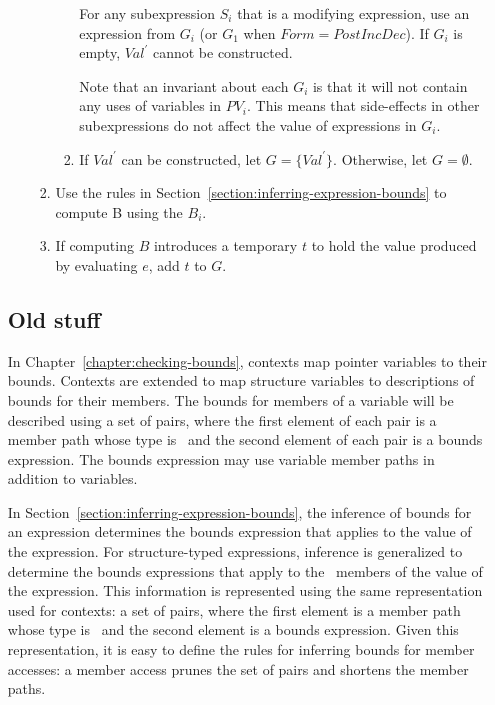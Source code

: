 \begin{enumerate}
\begin{enumerate}
\begin{enumerate}
\begin{enumerate}
      For any subexpression $S_i$ that is a modifying expression, 
      use an expression from $G_i$ (or $G_1$ when $Form = PostIncDec$). If $G_i$ is empty, $Val^\prime$ cannot
      be constructed.
      
      Note that an invariant about each $G_i$ is that it will not contain any uses of variables in $PV_i$.
      This means that side-effects in other subexpressions do not affect the value of expressions in $G_i$.
\item If $Val^\prime$ can be constructed, let $G = \{ Val^\prime \}$.  Otherwise, let $G = \emptyset$.	
\end{enumerate}
\item Use the rules in Section~\ref{section:inferring-expression-bounds} to compute B using the $B_i$. 
\item If computing $B$ introduces a temporary $t$ to hold the value produced by evaluating $e$, add $t$ to $G$.
\end{enumerate}
\end{enumerate}



\subsection{Old stuff}

In Chapter~\ref{chapter:checking-bounds}, contexts map pointer variables to their bounds.
Contexts are extended to map structure variables to descriptions of bounds for their
members.  The bounds for members of a variable will be described using a set of pairs,
where the first element of each pair is a member path whose type is \arrayptr\
and the second element of each pair is a bounds expression.  The bounds expression may use 
variable member paths in addition to variables.

In Section~\ref{section:inferring-expression-bounds}, the inference of bounds for an
expression determines the bounds expression that applies to the value of the
expression.  For structure-typed expressions, inference is generalized to determine
the bounds expressions that apply to the \arrayptr\ members of the value 
of the expression.  This information is represented using the same
representation used for contexts: a set of pairs, where the first element 
is a member path whose type is \arrayptr\ and the second element is a 
bounds expression.  Given this representation, it is easy to define
the rules for inferring bounds for member accesses: a member access prunes the
set of pairs and shortens the member paths.


\end{enumerate}
